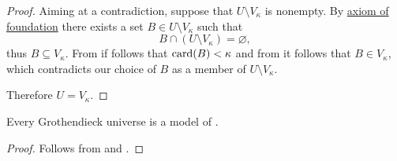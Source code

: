 \begin{proof}
  Aiming at a contradiction, suppose that \( U \setminus V_\kappa \) is nonempty. By \hyperref[def:zfc/foundation]{axiom of foundation} there exists a set \( B \in U \setminus V_\kappa \) such that
  \begin{equation*}
    B \cap (U \setminus V_\kappa) = \varnothing,
  \end{equation*}
  thus \( B \subseteq V_\kappa \). From  if follows that \( \operatorname{card}(B) < \kappa \) and from  it follows that \( B \in V_\kappa \), which contradicts our choice of \( B \) as a member of \( U \setminus V_\kappa \).

  Therefore \( U = V_\kappa \).
\end{proof}

\begin{corollary}\label{thm:grothendieck_universe_is_model_of_zfc}
  Every Grothendieck universe is a model of \hyperref[def:zfc]{}.
\end{corollary}
\begin{proof}
  Follows from  and .
\end{proof}
